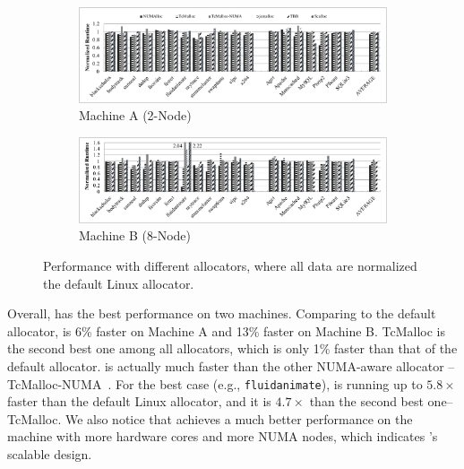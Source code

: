 \begin{figure}[H]
    \centering
    \begin{subfigure}{0.9\textwidth}
    \includegraphics[width=\textwidth]{figure/2-node-parsec-perf.pdf}
    \caption{Machine A (2-Node)\label{2node-parsec-perf}}
    \end{subfigure}
    
	\vspace{0.1in}  
	
	\begin{subfigure}{0.9\textwidth}    \includegraphics[width=\textwidth]{figure/8-node-parsec-perf.pdf}
    \caption{Machine B (8-Node)\label{8node-parsec-perf}}
    \end{subfigure}
    \caption{Performance with different allocators, where all data are normalized the default Linux allocator. \label{sec:perf}}
 \end{figure}


Overall, \NM{} has the best performance on two machines. Comparing to the default allocator, \NM{} is 6\% faster on Machine A and 13\% faster on Machine B. TcMalloc is the second best one among all allocators, which is only 1\% faster than that of the default allocator. \NM{} is actually much faster than the other NUMA-aware allocator -- TcMalloc-NUMA~\cite{tcmallocnew}. For the best case (e.g., \texttt{fluidanimate}), \NM{} is running up to  $5.8\times$ faster than the default Linux allocator, and it is $4.7\times$ than the second best one--TcMalloc. We also notice that \NM{} achieves a much better performance on the machine with more hardware cores and more NUMA nodes, which indicates \NM{}'s scalable design. 

